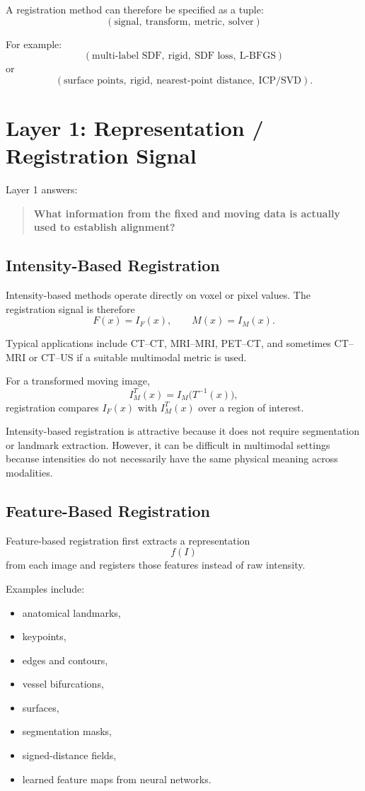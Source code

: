 \documentclass[11pt,a4paper]{article}
\begin{document}
A registration method can therefore be specified as a tuple:
\[
\boxed{
(\text{signal},\ \text{transform},\ \text{metric},\ \text{solver})
}
\]

For example:
\[
(\text{multi-label SDF},\ \text{rigid},\ \text{SDF loss},\ \text{L-BFGS})
\]
or
\[
(\text{surface points},\ \text{rigid},\ \text{nearest-point distance},\ \text{ICP/SVD}).
\]

\section{Layer 1: Representation / Registration Signal}

Layer 1 answers:

\begin{quote}
\textbf{What information from the fixed and moving data is actually used to establish alignment?}
\end{quote}

\subsection{Intensity-Based Registration}

Intensity-based methods operate directly on voxel or pixel values. The registration signal is therefore
\[
F(x)=I_F(x),
\qquad
M(x)=I_M(x).
\]

Typical applications include CT--CT, MRI--MRI, PET--CT, and sometimes CT--MRI or CT--US if a suitable multimodal metric is used.

For a transformed moving image,
\[
I_M^T(x)=I_M\bigl(T^{-1}(x)\bigr),
\]
registration compares $I_F(x)$ with $I_M^T(x)$ over a region of interest.

Intensity-based registration is attractive because it does not require segmentation or landmark extraction. However, it can be difficult in multimodal settings because intensities do not necessarily have the same physical meaning across modalities.

\subsection{Feature-Based Registration}

Feature-based registration first extracts a representation
\[
f(I)
\]
from each image and registers those features instead of raw intensity.

Examples include:
\begin{itemize}
  \item anatomical landmarks,
  \item keypoints,
  \item edges and contours,
  \item vessel bifurcations,
  \item surfaces,
  \item segmentation masks,
  \item signed-distance fields,
  \item learned feature maps from neural networks.
\end{itemize}
\end{document}
